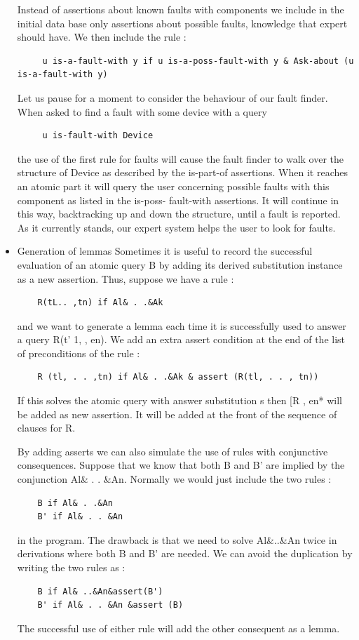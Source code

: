 \documentclass[14pt]{article}
\begin{document}
\begin{itemize}
Instead of assertions about known faults with components we include in 
the initial data base only assertions about possible faults, knowledge 
that expert should have. We then include the rule :
\begin{verbatim}
	 u is-a-fault-with y if u is-a-poss-fault-with y & Ask-about (u is-a-fault-with y) 
\end{verbatim}
Let us pause for a moment to consider the behaviour of our fault finder. When asked to find a fault with some device with a query
\begin{verbatim}
	 u is-fault-with Device
\end{verbatim}
the use of the first rule for faults will cause the fault finder to walk over the structure of Device as described by the is-part-of assertions. When it reaches an atomic part it will query the user concerning possible faults with this component as listed in the is-poss- fault-with assertions. It will continue in this way, backtracking up and down the structure, until a fault is reported. As it currently stands, our expert system helps the user to look for faults. 

\item Generation of lemmas 
Sometimes it is useful to record the successful evaluation of an atomic 
query B by adding its derived substitution instance as a new assertion. Thus, suppose we have a rule :
\begin{verbatim}
	R(tL.. ,tn) if Al& . .&Ak 
\end{verbatim}
and we want to generate a lemma each time it is successfully used to 
answer a query R(t' 1, , en). We add an extra assert condition at the 
end of the list of preconditions of the rule :
\begin{verbatim}
	R (tl, . . ,tn) if Al& . .&Ak & assert (R(tl, . . , tn))
\end{verbatim}
If this solves the atomic query with answer substitution s then [R , en* will be added as new assertion. It will be added at the front of the sequence of clauses for R.

By adding asserts we can also simulate the use of rules with 
conjunctive consequences. Suppose that we know that both B and B' are implied by the conjunction Al\& . . \&An. Normally we would just include the two rules : 
\begin{verbatim}
	B if Al& . .&An
	B' if Al& . . &An 
\end{verbatim}
in the program. The drawback is that we need to solve Al\&..\&An twice in 
derivations where both B and B' are needed. We can avoid the duplication by writing the two rules as :
\begin{verbatim}
	B if Al& ..&An&assert(B') 
	B' if Al& . . &An &assert (B) 
\end{verbatim}
The successful use of either rule will add the other consequent as a lemma. 


\end{itemize}
\end{document}
